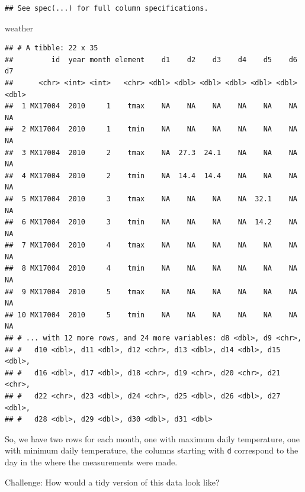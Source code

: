 \documentclass[]{article}
\newenvironment{Shaded}{\begin{snugshade}}{\end{snugshade}}
\newcommand{\KeywordTok}[1]{\textcolor[rgb]{0.13,0.29,0.53}{\textbf{{#1}}}}
\newcommand{\DataTypeTok}[1]{\textcolor[rgb]{0.13,0.29,0.53}{{#1}}}
\newcommand{\StringTok}[1]{\textcolor[rgb]{0.31,0.60,0.02}{{#1}}}
\newcommand{\OtherTok}[1]{\textcolor[rgb]{0.56,0.35,0.01}{{#1}}}
\newcommand{\NormalTok}[1]{{#1}}
\theoremstyle{definition}
\theoremstyle{definition}
\theoremstyle{remark}
\begin{document}
\begin{verbatim}
## See spec(...) for full column specifications.
\end{verbatim}

\begin{Shaded}
\begin{Highlighting}[]
\NormalTok{weather}
\end{Highlighting}
\end{Shaded}

\begin{verbatim}
## # A tibble: 22 x 35
##         id  year month element    d1    d2    d3    d4    d5    d6    d7
##      <chr> <int> <int>   <chr> <dbl> <dbl> <dbl> <dbl> <dbl> <dbl> <dbl>
##  1 MX17004  2010     1    tmax    NA    NA    NA    NA    NA    NA    NA
##  2 MX17004  2010     1    tmin    NA    NA    NA    NA    NA    NA    NA
##  3 MX17004  2010     2    tmax    NA  27.3  24.1    NA    NA    NA    NA
##  4 MX17004  2010     2    tmin    NA  14.4  14.4    NA    NA    NA    NA
##  5 MX17004  2010     3    tmax    NA    NA    NA    NA  32.1    NA    NA
##  6 MX17004  2010     3    tmin    NA    NA    NA    NA  14.2    NA    NA
##  7 MX17004  2010     4    tmax    NA    NA    NA    NA    NA    NA    NA
##  8 MX17004  2010     4    tmin    NA    NA    NA    NA    NA    NA    NA
##  9 MX17004  2010     5    tmax    NA    NA    NA    NA    NA    NA    NA
## 10 MX17004  2010     5    tmin    NA    NA    NA    NA    NA    NA    NA
## # ... with 12 more rows, and 24 more variables: d8 <dbl>, d9 <chr>,
## #   d10 <dbl>, d11 <dbl>, d12 <chr>, d13 <dbl>, d14 <dbl>, d15 <dbl>,
## #   d16 <dbl>, d17 <dbl>, d18 <chr>, d19 <chr>, d20 <chr>, d21 <chr>,
## #   d22 <chr>, d23 <dbl>, d24 <chr>, d25 <dbl>, d26 <dbl>, d27 <dbl>,
## #   d28 <dbl>, d29 <dbl>, d30 <dbl>, d31 <dbl>
\end{verbatim}

So, we have two rows for each month, one with maximum daily temperature,
one with minimum daily temperature, the columns starting with \texttt{d}
correspond to the day in the where the measurements were made.

Challenge: How would a tidy version of this data look like?

\begin{Shaded}
\end{Shaded}
\end{document}
